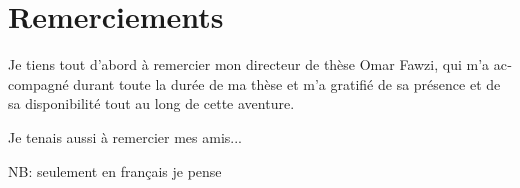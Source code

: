 \thispagestyle{empty}
\chapter*{Remerciements}

\begin{otherlanguage}{french}
  Je tiens tout d'abord à remercier mon directeur de thèse Omar Fawzi, qui m'a accompagné durant toute la durée de ma thèse et m'a gratifié de sa présence et de sa disponibilité tout au long de cette aventure.
  
  Je tenais aussi à remercier mes amis...

  NB: seulement en français je pense
\end{otherlanguage}
